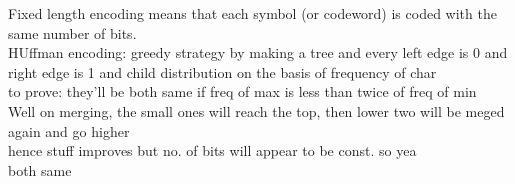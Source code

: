 Fixed length encoding means that each symbol (or codeword) is coded with the same number of bits.
\\
HUffman encoding: greedy strategy by making a tree and every left edge is 0 and right edge is 1 and child distribution on the basis of frequency of char
\\
to prove: they'll be both same if freq of max is less than twice of freq of min
\\
Well on merging, the small ones will reach the top, then lower two will be meged again and go higher
\\ hence stuff improves but no. of bits will appear to be const. so yea
\\both same